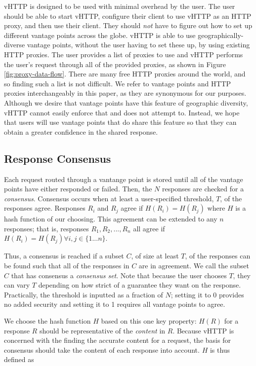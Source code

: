 vHTTP is designed to be used with minimal overhead by the user. The user should
be able to start vHTTP, configure their client to use vHTTP as an HTTP proxy,
and then use their client. They should \emph{not} have to figure out how to set
up different vantage points across the globe. vHTTP is able to use
geographically-diverse vantage points, without the user having to set these up,
by using existing HTTP proxies. The user provides a list of proxies to use and
vHTTP performs the user's request through all of the provided proxies, as shown
in Figure \ref{fig:proxy-data-flow}. There are many free HTTP proxies around
the world, and so finding such a list is not difficult. We refer to vantage
points and HTTP proxies interchangeably in this paper, as they are synonymous
for our purposes. Although we desire that vantage points have this feature of
geographic diversity, vHTTP cannot easily enforce that and does not attempt to.
Instead, we hope that users will use vantage points that do share this feature
so that they can obtain a greater confidence in the shared response.



\subsection{Response Consensus}

Each request routed through a vantange point is stored until all of the
vantage points have either responded or failed. Then, the $N$ responses are
checked for a \textit{consensus}. Consensus occurs when at least a
user-specified threshold, $T$, of the responses agree. Responses $R_i$ and
$R_j$ agree if $H(R_i) = H(R_j)$ where $H$ is a hash function of our choosing.
This agreement can be extended to any $n$ responses; that is, responses
$R_1, R_2, ..., R_n$ all agree if $H(R_i) = H(R_j) \forall i, j \in \{1...n\}$.

Thus, a consensus is reached if a subset $C$, of size at least $T$, of the
responses can be found such that all of the responses in $C$ are in agreement.
We call the subset $C$ that has consensus a \textit{consensus set}. Note that
because the user chooses $T$, they can vary $T$ depending on how strict of a
guarantee they want on the response. Practically, the threshold is inputted as
a fraction of $N$; setting it to 0 provides no added security and setting it
to 1 requires all vantage points to agree. 

We choose the hash function $H$ based on this one key property: $H(R)$ for a
response $R$ should be representative of the \emph{content} in $R$. Because
vHTTP is concerned with the finding the accurate content for a request, the
basis for consensus should take the content of each response into account.
$H$ is thus defined as

